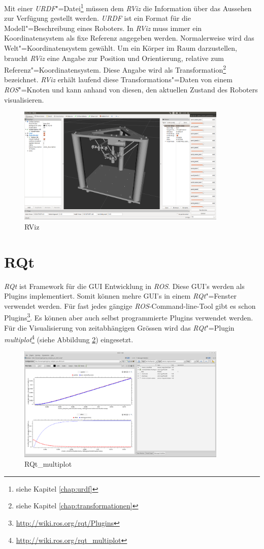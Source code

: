 Mit einer \textit{URDF}"=Datei\footnote{siehe Kapitel \ref{chap:urdf}} müssen dem \textit{RViz} die Information über das Aussehen zur Verfügung gestellt werden.
\textit{URDF} ist ein Format für die Modell"=Beschreibung eines Roboters.
In \textit{RViz} muss immer ein Koordinatensystem als fixe Referenz angegeben werden.
Normalerweise wird das Welt"=Koordinatensystem gewählt.
Um ein Körper im Raum darzustellen, braucht \textit{RViz} eine Angabe zur Position und Orientierung, relative zum Referenz"=Koordinatensystem.
Diese Angabe wird als Transformation\footnote{siehe Kapitel \ref{chap:transformationen}} bezeichnet.
\textit{RViz} erhält laufend diese Transformations"=Daten von einem \textit{ROS}"=Knoten und kann anhand von diesen, den aktuellen Zustand des Roboters visualisieren.
\begin{figure}[ht!]
	\centering
	\includegraphics[width=10cm]{images/rviz.png}
	\caption{RViz}
	\label{Ab:rviz}
\end{figure}

\section{RQt}
\label{chap:rqt}
\textit{RQt} ist Framework für die GUI Entwicklung in \textit{ROS}.
Diese GUI's werden als Plugins implementiert.
Somit können mehre GUI's in einem \textit{RQt}"=Fenster verwendet werden.
Für fast jedes gängige \textit{ROS}-Command-line-Tool gibt es schon Plugins\footnote{\url{http://wiki.ros.org/rqt/Plugins}}.
Es können aber auch selbst programmierte Plugins verwendet werden. 
Für die Visualisierung von zeitabhängigen Grössen wird das \textit{RQt}"=Plugin \textit{multiplot}\footnote{\url{http://wiki.ros.org/rqt_multiplot}} (siehe Abbildung \ref{Ab:rqt}) eingesetzt.
\begin{figure}[ht!]
	\centering
	\includegraphics[width=10cm]{images/rqt.png}
	\caption{RQt\_multiplot}
	\label{Ab:rqt}
\end{figure}


